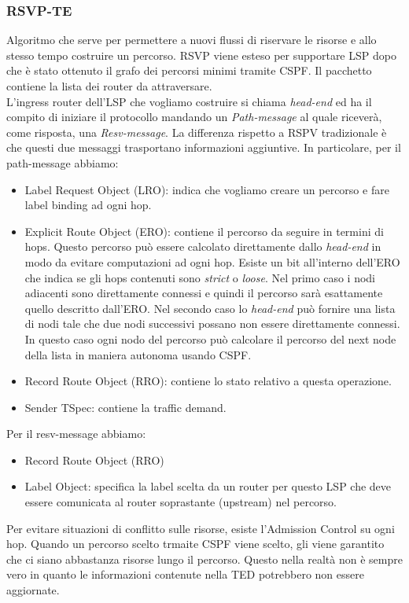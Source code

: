 \documentclass{article}
\begin{document}
\subsubsection{RSVP-TE}
Algoritmo che serve per permettere a nuovi flussi di riservare le risorse e allo stesso tempo costruire un percorso. RSVP viene esteso per supportare LSP dopo che è stato ottenuto il grafo dei percorsi minimi tramite CSPF. Il pacchetto contiene la lista dei router da attraversare.\\
L'ingress router dell'LSP che vogliamo costruire si chiama \textit{head-end} ed ha il compito di iniziare il protocollo mandando un \textit{Path-message} al quale riceverà, come risposta, una \textit{Resv-message}. La differenza rispetto a RSPV tradizionale è che questi due messaggi trasportano informazioni aggiuntive. In particolare, per il path-message abbiamo:
\begin{itemize}
    \item Label Request Object (LRO): indica che vogliamo creare un percorso e fare label binding ad ogni hop.
    \item Explicit Route Object (ERO): contiene il percorso da seguire in termini di hops. Questo percorso può essere calcolato direttamente dallo \textit{head-end} in modo da evitare computazioni ad ogni hop. Esiste un bit all'interno dell'ERO che indica se gli hops contenuti sono \textit{strict} o \textit{loose}. Nel primo caso i nodi adiacenti sono direttamente connessi e quindi il percorso sarà esattamente quello descritto dall'ERO. Nel secondo caso lo \textit{head-end} può fornire una lista di nodi tale che due nodi successivi possano non essere direttamente connessi. In questo caso ogni nodo del percorso può calcolare il percorso del next node della lista in maniera autonoma usando CSPF.
    \item Record Route Object (RRO): contiene lo stato relativo a questa operazione.
    \item Sender TSpec: contiene la traffic demand.
\end{itemize}
Per il resv-message abbiamo:
\begin{itemize}
    \item Record Route Object (RRO)
    \item Label Object: specifica la label scelta da un router per questo LSP che deve essere comunicata al router soprastante (upstream) nel percorso.
\end{itemize}
Per evitare situazioni di conflitto sulle risorse, esiste l'Admission Control su ogni hop. Quando un percorso scelto trmaite CSPF viene scelto, gli viene garantito che ci siano abbastanza risorse lungo il percorso. Questo nella realtà non è sempre vero in quanto le informazioni contenute nella TED potrebbero non essere aggiornate.\\
\end{document}
